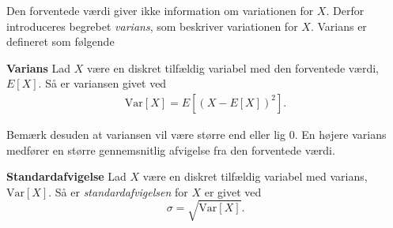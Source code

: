 


Den forventede værdi giver ikke information om variationen for $X$. Derfor introduceres begrebet \textit{varians}, som beskriver variationen for $X$. Varians er defineret som følgende

\begin{minipage}\textwidth
\begin{defn}\textbf{Varians}\label{def:varians} %
\newline
Lad $X$ være en diskret tilfældig variabel med den forventede værdi, $E[X]$. Så er variansen givet ved
\begin{align*}
    \text{Var}[X]=E\left[\left(X-E[X]\right)^2\right].
\end{align*}
\end{defn}
\end{minipage}



Bemærk desuden at variansen vil være større end eller lig $0$. En højere varians medfører en større gennemsnitlig afvigelse fra den forventede værdi. 

\begin{minipage}\textwidth
\begin{defn}\textbf{Standardafvigelse} %
\newline
Lad $X$ være en diskret tilfældig variabel med varians, $\text{Var}[X]$. Så er \textit{standardafvigelsen} for $X$ er givet ved 
$$\sigma = \sqrt{\text{Var}[X]}.$$
\end{defn}
\end{minipage}

